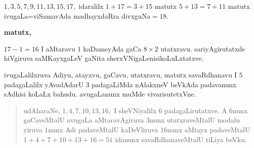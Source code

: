 $1,3,5,7,9,11,13,15,17,$ idaralilx $1+17=3+15$ matutx $5+13=7+11$ matutx ivugaLa=viSamavAda madhayxdaRra divxguNa$=18.$

\begin{center}
{\bf matutx,}
\end{center}

$17-1=16$ I aMtaravu $1$ kaDameyAda gaCa $8\times2$ utatxravu. sariyAgirutatxde hiVgiruva saMKayxgaLeV gaNita sherxVNigaLenisikoLuLxtatxve.

ivugaLalilxruva Adiyu, atayxvu, gaCavu, utatxravu, matutx savaRdhanavu I $5$ padagaLalilx yAvadAdarU $3$ padagaLiMda nAlakxneV beVkAda padavanunx sAdhisi koLaLx bahudu. avugaLanunx muMde vivarisutetxVne.

\begin{verse}
udAharaNe, $1,4,7,10,13,16,$ I sheVNiyalilx $6$ padagaLirutatxve. A $6$nunx gaCaveMtalU avugaLa aMtaravAgiruva $3$nunx utatxraveMtalU modalu yiruva $1$nunx Adi padaveMtalU kaDeVliruva $16$nunx aMtayx padaveMtalU $1+4+7+10+13+16=51$ idanunx savaRdhanaveMtalU tiLiya beVku.
\end{verse}
